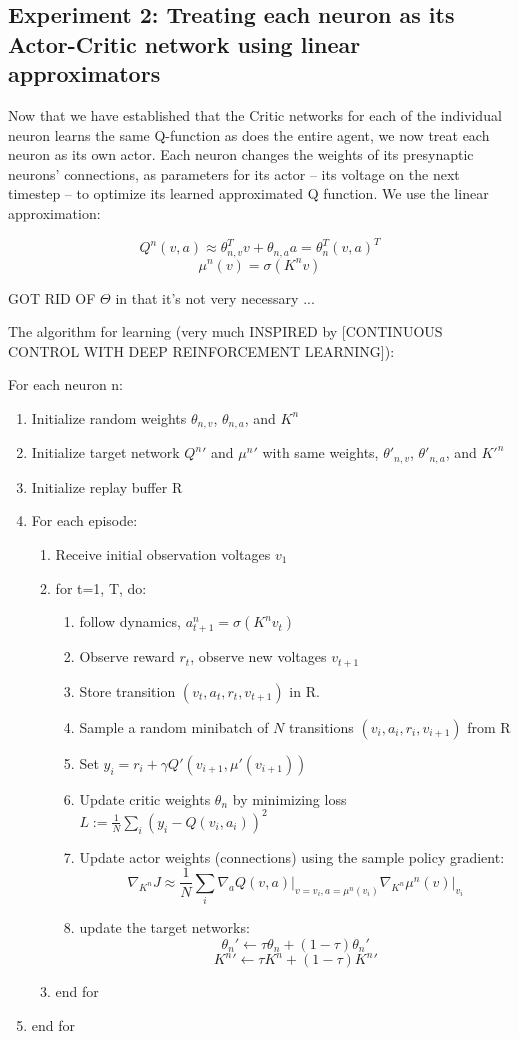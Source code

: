 \subsection{Experiment 2: Treating each neuron as its Actor-Critic network using linear approximators}

Now that we have established that the Critic networks for each of the individual neuron learns the same Q-function as does the entire agent, we now treat each neuron as its own actor. Each neuron changes the weights of its presynaptic neurons' connections, as parameters for its actor -- its voltage on the next timestep -- to optimize its learned approximated Q function. We use the linear approximation:

$$Q^{n}(v, a) \approx \theta_{n,v}^T v + \theta_{n,a}a = \theta_{n}^T (v, a)^T$$
$$\mu^{n}(v) = \sigma(K^n v)$$

GOT RID OF $\Theta$ in that it's not very necessary ...

The algorithm for learning (very much INSPIRED by [CONTINUOUS CONTROL WITH DEEP REINFORCEMENT
LEARNING]):

For each neuron n:
\begin{enumerate}
\item[] Initialize random weights $\theta_{n,v}$, $\theta_{n,a}$, and $K^n$
\item[] Initialize target network ${Q^n}'$ and ${\mu^n}'$ with same weights, $\theta'_{n,v}$, $\theta'_{n,a}$, and $K'^n$
\item[] Initialize replay buffer R
\item[] For each episode:
\begin{enumerate}
\item[] Receive initial observation voltages $v_1$
\item[] for t=1, T, do:
\begin{enumerate}
\item[] follow dynamics, $a^n_{t+1} = \sigma(K^n v_t)$
\item[] Observe reward $r_t$, observe new voltages $v_{t+1}$
\item[] Store transition $(v_t, a_t, r_t, v_{t+1})$ in R.
\item[] Sample a random minibatch of $N$ transitions $(v_i, a_i, r_i, v_{i+1})$ from R
\item[] Set $y_i = r_i + \gamma Q'(v_{i+1}, \mu'(v_{i+1}))$
\item[] Update critic weights $\theta_n$ by minimizing loss $L := \frac{1}{N} \sum_i (y_i - Q(v_i, a_i))^2$
\item[] Update actor weights (connections) using the sample policy gradient:
$$\nabla_{K^n} J \approx \frac{1}{N} \sum_i \nabla_a Q(v, a) \vert_{v=v_i, a=\mu^n(v_i)} \nabla_{K^n} \mu^n(v) \vert_{v_i}$$
\item[] update the target networks:
$$\theta_n' \leftarrow \tau \theta_n + (1 - \tau) \theta_n'$$
$${K^n}' \leftarrow \tau K^n + (1 - \tau) {K^n}'$$
\end{enumerate}
\item[] end for
\end{enumerate}
\item[] end for
\end{enumerate}

